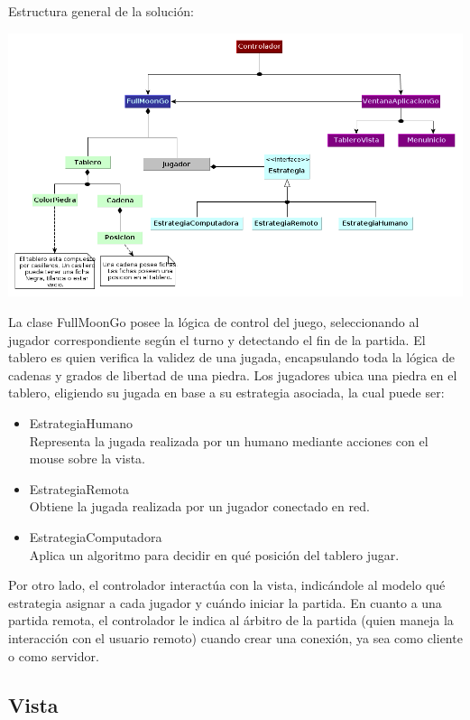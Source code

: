 \documentclass[11pt]{article}
\begin{document}
Estructura general de la soluci\'on:

\begin{center}
 \includegraphics[scale=0.55]{./Diagramas/DiagramaClases/diagrama_de_clases.png}
\end{center}

La clase FullMoonGo posee la l\'ogica de control del juego, seleccionando al jugador correspondiente seg\'un el turno y
detectando el fin de la partida. El tablero es quien verifica la validez de una jugada, encapsulando toda la l\'ogica de cadenas y grados de libertad de una piedra.
Los jugadores ubica una piedra en el tablero, eligiendo su jugada en base a su estrategia asociada, la cual puede ser:
\begin{itemize}
 \item EstrategiaHumano\\
      Representa la jugada realizada por un humano mediante acciones con el mouse sobre la vista.
 \item EstrategiaRemota\\
      Obtiene la jugada realizada por un jugador conectado en red.
 \item	EstrategiaComputadora \\
      Aplica un algoritmo para decidir en qu\'e posici\'on del tablero jugar.
\end{itemize}

Por otro lado, el controlador interact\'ua con la vista, indic\'andole al modelo qu\'e estrategia asignar a cada jugador y
cu\'ando iniciar la partida. En cuanto a una partida remota, el controlador le indica al \'arbitro de la partida (quien maneja la interacci\'on 
con el usuario remoto) cuando crear una conexi\'on, ya sea como cliente o como servidor.

\subsection{Vista}
\label{sec-4.1}
\end{document}
